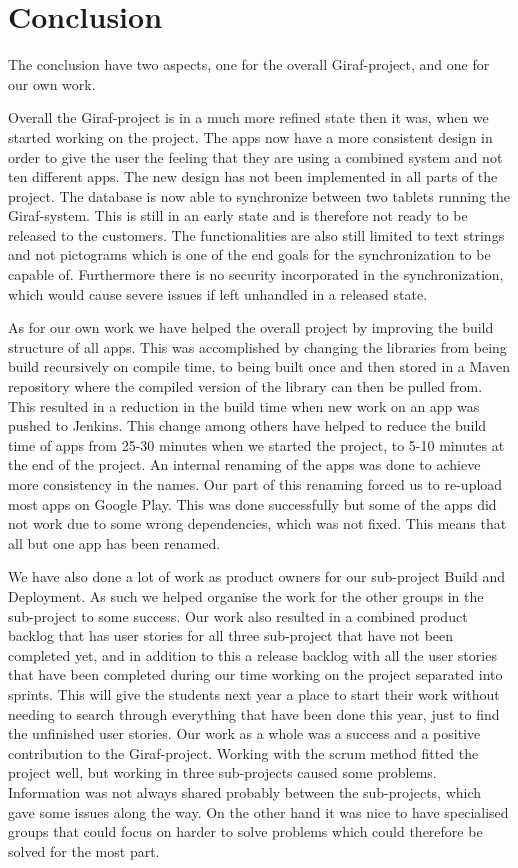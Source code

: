 \chapter{Conclusion} \label{ChapConclusion}
The conclusion have two aspects, one for the overall Giraf-project, and one for our own work.

Overall the Giraf-project is in a much more refined state then it was, when we started working on the project.
The apps now have a more consistent design in order to give the user the feeling that they are using a combined system and not ten different apps. The new design has not been implemented in all parts of the project.
The database is now able to synchronize between two tablets running the Giraf-system. This is still in an early state and is therefore not ready to be released to the customers. The functionalities are also still limited to text strings and not pictograms which is one of the end goals for the synchronization to be capable of. Furthermore there is no security incorporated in the synchronization, which would cause severe issues if left unhandled in a released state.

As for our own work we have helped the overall project by improving the build structure of all apps. This was accomplished by changing the libraries from being build recursively on compile time, to being built once and then stored in a Maven repository where the compiled version of the library can then be pulled from. This resulted in a reduction in the build time when new work on an app was pushed to Jenkins. This change among others have helped to reduce the build time of apps from 25-30 minutes when we started the project, to 5-10 minutes at the end of the project. 
An internal renaming of the apps was done to achieve more consistency in the names. Our part of this renaming forced us to re-upload most apps on Google Play. This was done successfully but some of the apps did not work due to some wrong dependencies, which was not fixed. This means that all but one app has been renamed.

We have also done a lot of work as product owners for our sub-project Build and Deployment. As such we helped organise the work for the other groups in the sub-project to some success. Our work also resulted in a combined product backlog that has user stories for all three sub-project that have not been completed yet, and in addition to this a release backlog with all the user stories that have been completed during our time working on the project separated into sprints. This will give the students next year a place to start their work without needing to search through everything that have been done this year, just to find the unfinished user stories.
Our work as a whole was a success and a positive contribution to the Giraf-project. Working with the scrum method fitted the project well, but working in three sub-projects caused some problems. Information was not always shared probably between the sub-projects, which gave some issues along the way. On the other hand it was nice to have specialised groups that could focus on harder to solve problems which could therefore be solved for the most part.
